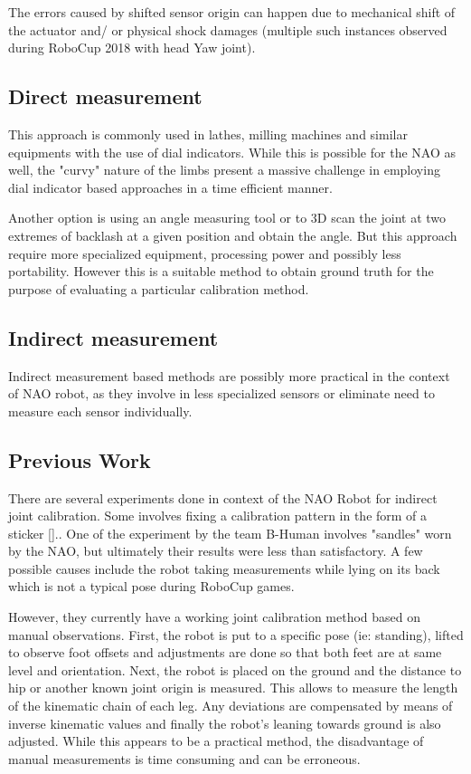\documentclass[english, printversion, nomenclature, notitle]{tuvisionthesis} %
\begin{document}
The errors caused by shifted sensor origin can happen due to mechanical shift of the actuator and/ or physical shock damages (multiple such instances observed during RoboCup 2018 with head Yaw joint).
\subsection{Direct measurement}

This approach is commonly used in lathes, milling machines and similar equipments with the use of dial indicators. While this is possible for the NAO as well, the "curvy" nature of the limbs present a massive challenge in employing dial indicator based approaches in a time efficient manner.

Another option is using an angle measuring tool or to 3D scan the joint at  two extremes of backlash at a given position and obtain the angle. But this approach require more specialized equipment, processing power and possibly less portability. However this is a suitable method to obtain ground truth for the purpose of evaluating a particular calibration method. 

\subsection{Indirect measurement}
Indirect measurement based methods are possibly more practical in the context of NAO robot, as they involve in less specialized sensors or eliminate need to measure each sensor individually.
\subsection{Previous Work}

There are several experiments done in context of the NAO Robot for indirect joint calibration. Some involves fixing a calibration pattern in the form of a sticker [].. One of the experiment by the team B-Human involves "sandles" worn by the NAO, but ultimately their results were less than satisfactory. A few possible causes include the robot taking measurements while lying on its back which is not a typical pose during RoboCup games. 

However, they currently have a working joint calibration method based on manual observations. First, the robot is put to a specific pose (ie: standing), lifted to observe foot offsets and adjustments are done so that both feet are at same level and orientation. Next, the robot is placed on the ground and the distance to hip or another known joint origin is measured. This allows to measure the length of the kinematic chain of each leg. Any deviations are compensated by means of inverse kinematic values and finally the robot's leaning  towards ground is also adjusted. While this appears to be a practical method, the disadvantage of manual measurements is time consuming and can be erroneous.
\end{document}
